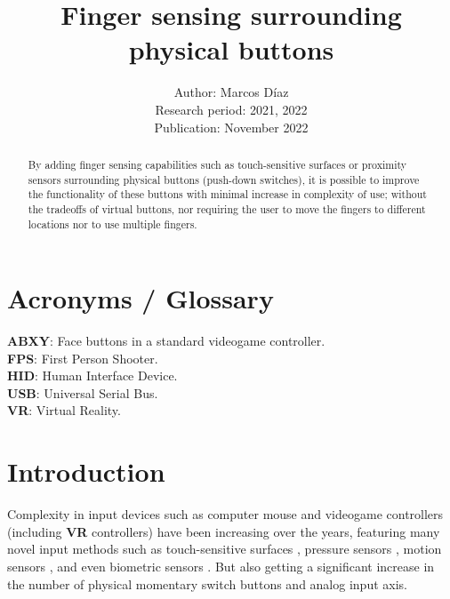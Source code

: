 \documentclass[10pt, twocolumn, a4paper]{article}
\begin{document}
    \title{Finger sensing surrounding physical buttons}
    \author{
        Author: Marcos Díaz\\
        Research period: 2021, 2022\\
        Publication: November 2022
    }
    \date{}
    \maketitle


\begin{abstract}
    By adding finger sensing capabilities such as touch-sensitive surfaces or proximity sensors surrounding physical buttons (push-down switches), it is possible to improve the functionality of these buttons with minimal increase in complexity of use; without the tradeoffs of virtual buttons, nor requiring the user to move the fingers to different locations nor to use multiple fingers.
\end{abstract}

\section*{Acronyms / Glossary}
    {\textbf{ABXY}}: Face buttons in a standard videogame controller.\\
    {\textbf{FPS}}: First Person Shooter.\\
    {\textbf{HID}}: Human Interface Device.\\
    {\textbf{USB}}: Universal Serial Bus.\\
    {\textbf{VR}}: Virtual Reality.

\section{Introduction}
    Complexity in input devices such as computer mouse and videogame controllers (including \textbf{VR} controllers) have been increasing over the years, featuring many novel input methods such as touch-sensitive surfaces \cite{capacitative}, pressure sensors \cite{pressure}, motion sensors \cite{piezo_mems}, and even biometric sensors \cite{biometrics}. But also getting a significant increase in the number of physical momentary switch buttons and analog input axis.
\end{document}
